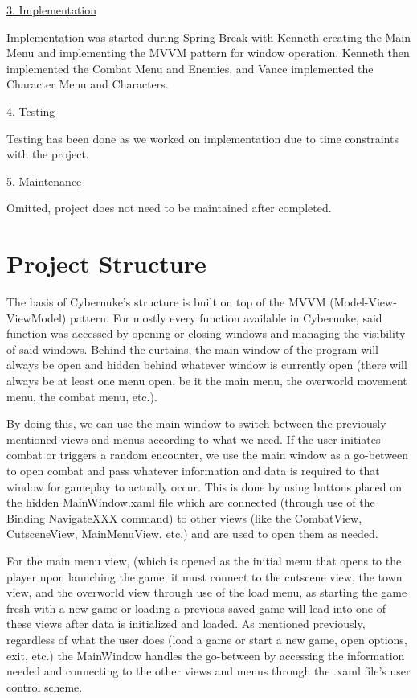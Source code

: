 \documentclass[10pt,conference,onecolumn,compsoc]{IEEEtran}
\begin{document}
\underline{3. Implementation}
\vspace{5px}

Implementation was started during Spring Break with Kenneth creating the Main Menu and implementing the MVVM pattern for window operation. Kenneth then implemented the Combat Menu and Enemies, and Vance implemented the Character Menu and Characters.

\underline{4. Testing}
\vspace{5px}

Testing has been done as we worked on implementation due to time constraints with the project.

\underline{5. Maintenance}
\vspace{5px}

Omitted, project does not need to be maintained after completed.


\section{Project Structure}
The basis of Cybernuke's structure is built on top of the MVVM (Model-View-ViewModel) pattern. For mostly every function available in Cybernuke, said function was accessed by opening or closing windows and managing the visibility of said windows. Behind the curtains, the main window of the program will always be open and hidden behind whatever window is currently open (there will always be at least one menu open, be it the main menu, the overworld movement menu, the combat menu, etc.). 

By doing this, we can use the main window to switch between the previously mentioned views and menus according to what we need. If the user initiates combat or triggers a random encounter, we use the main window as a go-between to open combat and pass whatever information and data is required to that window for gameplay to actually occur. This is done by using buttons placed on the hidden MainWindow.xaml file which are connected (through use of the Binding NavigateXXX command) to other views (like the CombatView, CutsceneView, MainMenuView, etc.) and are used to open them as needed.

For the main menu view, (which is opened as the initial menu that opens to the player upon launching the game, it must connect to the cutscene view, the town view, and the overworld view through use of the load menu, as starting the game fresh with a new game or loading a previous saved game will lead into one of these views after data is initialized and loaded. As mentioned previously, regardless of what the user does (load a game or start a new game, open options, exit, etc.) the MainWindow handles the go-between by accessing the information needed and connecting to the other views and menus through the .xaml file's user control scheme.
\end{document}
